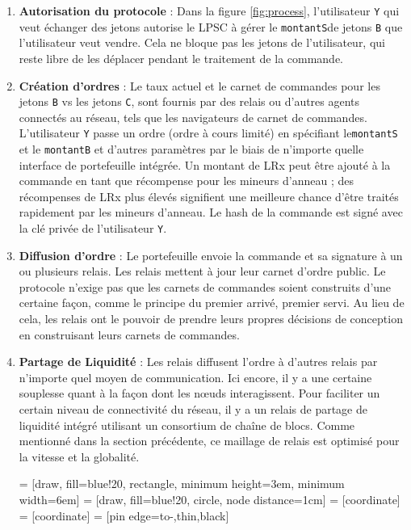 \documentclass[UTF8,nofonts]{article}
\makeatletter
\newenvironment{figurehere}
 {\def\@captype{figure}}
 {}
\makeatother
\begin{document}
\begin{multicols}{2}
\begin{enumerate} 


\item \textbf{Autorisation du protocole} : Dans la figure \ref{fig:process}, l'utilisateur \verb|Y| qui veut échanger des jetons autorise le LPSC à gérer le \verb|montantS|de jetons \verb|B| que l'utilisateur veut vendre. Cela ne bloque pas les jetons de l'utilisateur, qui reste libre de les déplacer pendant le traitement de la commande.

\item \textbf{Création d’ordres} : Le taux actuel et le carnet de commandes pour les jetons \verb|B| vs les jetons \verb|C|, sont fournis par des relais ou d'autres agents connectés au réseau, tels que les navigateurs de carnet de commandes. L'utilisateur \verb|Y| passe un ordre (ordre à cours limité) en spécifiant le\verb|montantS| et le \verb|montantB| et d'autres paramètres par le biais de n'importe quelle interface de portefeuille intégrée. Un montant de LRx peut être ajouté à la commande en tant que récompense pour les mineurs d'anneau ; des récompenses de LRx plus élevés signifient une meilleure chance d'être traités rapidement par les mineurs d'anneau. Le hash de la commande est signé avec la clé privée de l'utilisateur \verb|Y|.

\item \textbf{Diffusion d’ordre} : Le portefeuille envoie la commande et sa signature à un ou plusieurs relais. Les relais mettent à jour leur carnet d'ordre public. Le protocole n'exige pas que les carnets de commandes soient construits d'une certaine façon, comme le principe du premier arrivé, premier servi. Au lieu de cela, les relais ont le pouvoir de prendre leurs propres décisions de conception en construisant leurs carnets de commandes.

\item \textbf{Partage de Liquidité} : Les relais diffusent l'ordre à d'autres relais par n'importe quel moyen de communication. Ici encore, il y a une certaine souplesse quant à la façon dont les nœuds interagissent. Pour faciliter un certain niveau de connectivité du réseau, il y a un relais de partage de liquidité intégré utilisant un consortium de chaîne de blocs. Comme mentionné dans la section précédente, ce maillage de relais est optimisé pour la vitesse et la globalité.

\begin{center}
\begin{figurehere}
\centering
{} = [draw, fill=blue!20, rectangle, 
    minimum height=3em, minimum width=6em]
 = [draw, fill=blue!20, circle, node distance=1cm]
 = [coordinate]
 = [coordinate]
 = [pin edge={to-,thin,black}]


\end{figurehere}
\end{center}
\end{enumerate}
\end{multicols}
\end{document}

